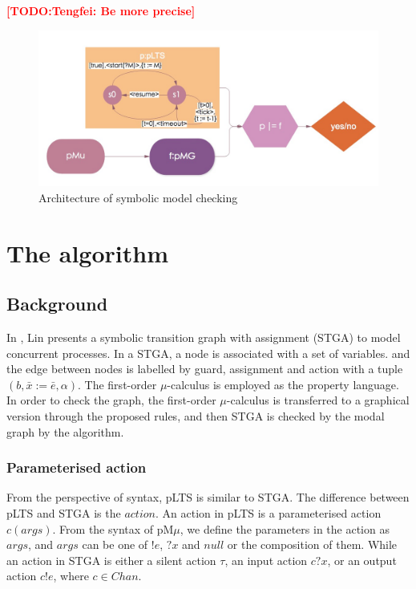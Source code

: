 \documentclass[runningheads,a4paper]{llncs}
\newcommand{\TODO}[1]{\textcolor{red}{\textbf{[TODO:#1]}}}
\begin{document}
\TODO{Tengfei: Be more precise}


\begin{figure}
    \centering\includegraphics[width=5.5in]{figures/architectrue.jpeg} 
    \caption{Architecture of symbolic model checking}
    \label{architectrue}
\end{figure}






\section{The algorithm}\label{algorithm}

\subsection{Background}

 In \cite{lin1996stga}, Lin presents a symbolic transition graph with assignment (STGA) to model concurrent processes. In a STGA, a node is associated with a set of variables. and the edge between nodes is labelled by guard, assignment and action with a tuple $(b, \bar{x}:=\bar{e}, \alpha)$. The first-order $\mu$-calculus is employed as the property language. In order to check the graph, the first-order $\mu$-calculus is transferred to a graphical version through the proposed rules, and then STGA is checked by the modal graph by the algorithm.
 

 
 \subsubsection{Parameterised action}
From the perspective of syntax, pLTS is similar to STGA. The difference between pLTS and STGA is the $\mathit{action}$. An action in pLTS is a parameterised action $c(args)$. From the syntax of pM$\mu$, we define the parameters in the action as $args$, and $args$ can be one of $!e$, $?x$ and $null$ or the composition of them. While an action in STGA is either a silent action $\tau$, an input action $c?x$, or an output action $c!e$, where $c\in Chan$. 
\end{document}
